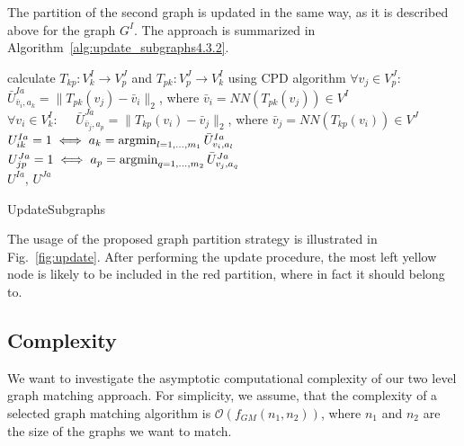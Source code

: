 The partition of the second graph is updated in the same way, as it is described above for the graph $G^I$. The approach is summarized in Algorithm~\ref{alg:update_subgraphs4.3.2}.

\begin{algorithm}[h]
	{
		calculate $T_{kp}:V^I_k\rightarrow V^J_p$ and $T_{pk}:V^J_p\rightarrow V^I_k$ using CPD algorithm
	}
	{
		$\forall v_j\in V^J_p:\quad$ $\bar{U}^{Ia}_{\bar{v}_i,a_k}=\|T_{pk}(v_j)-\bar{v}_i\|_2$, where $\bar{v}_i=NN(T_{pk}(v_j))\in V^I$\\
		$\forall v_i\in V^I_k:\quad$ $\bar{U}^{Ja}_{\bar{v}_j,a_p}=\|T_{kp}(v_i)-\bar{v}_j\|_2$, where $\bar{v}_j=NN(T_{kp}(v_i))\in V^J$
	}
	$U^{Ia}_{ik}=1 \iff a_k=\mathop{\rm argmin}_{l=1,\dots,m_1}^{}{\bar{U}^{Ia}_{v_i,a_l}}$\\
	$U^{Ja}_{jp}=1 \iff a_p=\mathop{\rm argmin}_{q=1,\dots,m_2}^{}{\bar{U}^{Ja}_{v_j,a_q}}$\\
	\Return $U^{Ia}$, $U^{Ja}$
	
	\caption{UpdateSubgraphs}    \label{alg:update_subgraphs4.3.2}
\end{algorithm}

The usage of the proposed graph partition strategy is illustrated in Fig.~\ref{fig:update}. After performing the update procedure, the most left yellow node is likely to be included in the red partition, where in fact it should belong to.
\FloatBarrier
\subsection{Complexity}
We want to investigate the asymptotic computational complexity of our two level graph matching approach. For simplicity, we assume, that the complexity of a selected graph matching algorithm is $\mathcal{O}(f_{GM}(n_1,n_2))$, where $n_1$ and $n_2$ are the size of the graphs we want to match.

